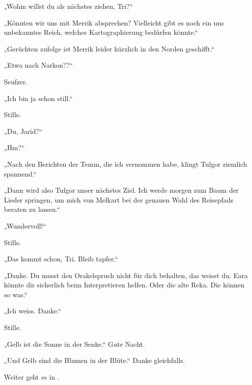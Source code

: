 „Wohin willst du als nächstes ziehen, Tri?“

„Könnten wir uns mit Merrik absprechen? Vielleicht gibt es noch ein uns unbekanntes Reich, welches Kartographierung bedürfen könnte.“

„Gerüchten zufolge ist Merrik leider kürzlich in den Norden geschifft.“

„Etwa nach Narkon??“

Seufzer.

„Ich bin ja schon still.“

Stille.

„Du, Jarid?“

„Hm?“

„Nach den Berichten der Temm, die ich vernommen habe, klingt Tulgor ziemlich spannend.“

„Dann wird also Tulgor unser nächstes Ziel. Ich werde morgen zum Baum der Lieder springen, um mich von Melkart bei der genauen Wahl des Reisepfads beraten zu lassen.“

„Wundervoll!“

Stille.

„Das kommt schon, Tri. Bleib tapfer.“

„Danke. Du musst den Orakelspruch nicht für dich behalten, das weisst du. Eara könnte dir sicherlich beim Interpretieren helfen. Oder die alte Reka. Die können so was.“

„Ich weiss. Danke.“

Stille.

„Gelb ist die Sonne in der Senke.“ Gute Nacht.

„Und Gelb sind die Blumen in der Blüte.“ Danke gleichfalls.

\begin{commentbox}
    Weiter geht es in .
\end{commentbox}

